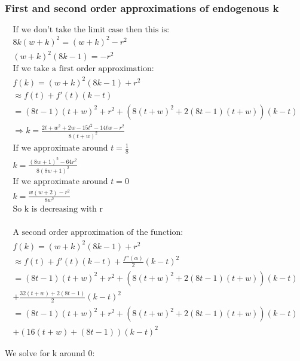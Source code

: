 \subsubsection{First and second order approximations of endogenous k}

\begin{align*}
\text{If we don't take the limit case then this is:} \\
8k(w+k)^2= \left( w+k \right)^2 -r^2 \\
(w+k)^2(8k-1)=-r^2 \\
\text{If we take a first order approximation:} \\
f(k)= (w+k)^2(8k-1)+r^2 
\\
\approx f(t)+f'(t)(k-t) \\
=(8 t-1) (t+w)^2+r^2 
+(8 (t+w)^2+2 (8 t-1) (t+w))(k-t) \\
\Rightarrow k = \frac{2 t+w^2+2 w-15 t^2-14 t w-r^2}{8 (t+w)^2}
\\
\text{If we approximate around $t=\frac{1}{8}$} \\
k = \frac{(8 w+1)^2-64 r^2}{8 (8 w+1)^2} 
\\
\text{If we approximate around $t=0$} \\
k= \frac{w (w+2)-r^2}{8 w^2}
\\
\text{So k is decreasing with r} \\
\end{align*}

\begin{align*}
\text{A second order approximation of the function:} \\ 
f(k)= (w+k)^2(8k-1)+r^2 \\
\approx f(t)+f'(t)(k-t)+\frac{f''(\alpha)}{2}(k-t)^2 \\
= (8 t-1) (t+w)^2+r^2 
+(8 (t+w)^2+2 (8 t-1) (t+w))(k-t) \\
+\frac{32 (t+w)+2 (8 t-1)}{2}(k-t)^2 \\
= (8 t-1) (t+w)^2+r^2 
+(8 (t+w)^2+2 (8 t-1) (t+w))(k-t) \\
+(16 (t+w)+ (8 t-1))(k-t)^2 
\end{align*}



We solve for k around 0: 

